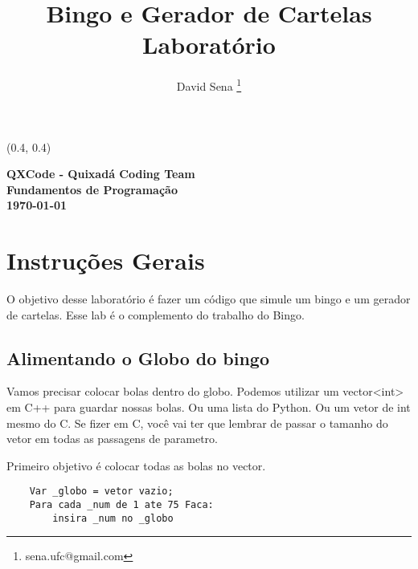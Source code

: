 \documentclass[12pt]{article}
\begin{document}

\begin{textblock}{15}(0.4, 0.4)
\noindent
\begin{center}
\LARGE{\bf{QXCode - Quixadá Coding Team}}\\
\large{\bf{Fundamentos de Programação}} \\
\large{\bf{\today}}
\end{center}
\end{textblock}

\title{\bf{Bingo e Gerador de Cartelas\\
		Laboratório}}

\author{
David Sena \thanks{sena.ufc@gmail.com}
}

\date{}

\maketitle
\thispagestyle{empty}



\section{Instruções Gerais}
O objetivo desse laboratório é fazer um código que simule um bingo e um gerador 
de cartelas. Esse lab é o complemento do trabalho do Bingo.

\subsection{Alimentando o Globo do bingo}

Vamos precisar colocar bolas dentro do globo. Podemos utilizar um
vector<int> em C++ para guardar nossas bolas. Ou uma lista do Python. Ou um 
vetor de int mesmo do C. Se fizer em C, você vai ter que lembrar de passar
o tamanho do vetor em todas as passagens de parametro.

Primeiro objetivo é colocar todas as bolas no vector.

\begin{lstlisting}
	Var _globo = vetor vazio;
	Para cada _num de 1 ate 75 Faca:
		insira _num no _globo
\end{lstlisting}
\end{document}
